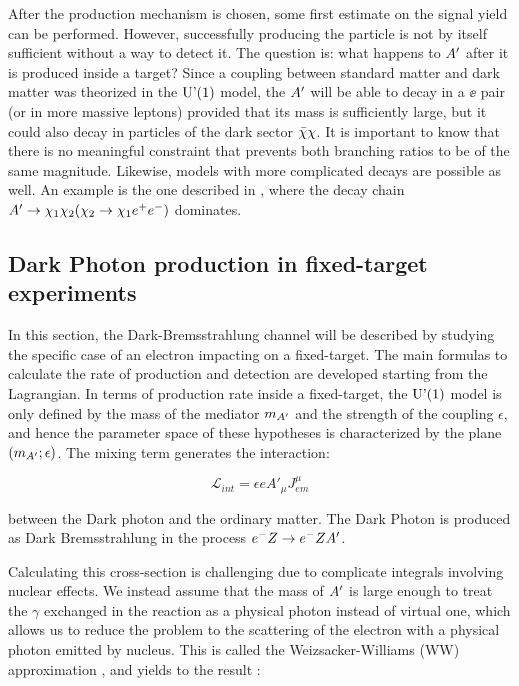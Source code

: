 After the production mechanism is chosen, some first estimate on the signal yield can be performed. However, successfully producing the particle is not by itself sufficient without a way to detect it. The question is: what happens to $A'$ after it is produced inside a target? Since a coupling between standard matter and dark matter was theorized in the $\textrm{U'(1)}$ model, the $A'$ will be able to decay in a $\ee$ pair (or in more massive leptons) provided that its mass is sufficiently large, but it could also decay in particles of the dark sector $\bar{\chi} \chi$. It is important to know that there is no meaningful constraint that prevents both branching ratios to be of the same magnitude. Likewise, models with more complicated decays are possible as well. An example is the one described in \cite{Mohlabeng_2019}, where the decay chain $A' \to \chi_1 \chi_2(\chi_2 \to \chi_1 e^+e^-)$ dominates. 

\subsection{Dark Photon production in fixed-target experiments}
\label{ch1:sec:dm-u1model}

In this section, the Dark-Bremsstrahlung channel will be described by studying the specific case of an electron impacting on a fixed-target. The main formulas to calculate the rate of production and detection are developed starting from the Lagrangian. In terms of production rate inside a fixed-target, the $\textrm{U'(1)}$ model is only defined by the mass of the mediator $m_{A'}$ and the strength of the coupling $\epsilon$, and hence the parameter space of these hypotheses is characterized by the plane $(m_{A'};\epsilon)$. The mixing term generates the interaction:

\begin{equation}
  \label{eq:dm-interaction}
  \mathcal{L}_{int} = \epsilon e A'_{\mu}J^{\mu}_{em}
\end{equation}

between the Dark photon and the ordinary matter. The Dark Photon is produced as Dark Bremsstrahlung in the process $e^- Z \to e^- Z A'$.

Calculating this cross-section is challenging due to complicate integrals involving nuclear effects. We instead assume that the mass of $A'$ is large enough to treat the $\gamma$ exchanged in the reaction as a physical photon instead of virtual one, which allows us to reduce the problem to the scattering of the electron with a physical photon emitted by nucleus. This is called the Weizsacker-Williams (WW) approximation \cite{Kim:1973he}, and yields to the result \cite{jdb}:

